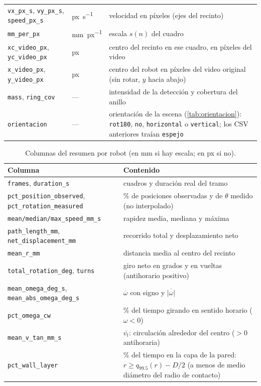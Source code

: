 \begin{table}[H]
\begin{tabular}{@{}p{3.9cm}lp{8.2cm}@{}}
    \texttt{vx\_px\_s}, \texttt{vy\_px\_s}, \texttt{speed\_px\_s} & \si{px\per\second} & velocidad en píxeles (ejes del recinto) \\
    \texttt{mm\_per\_px} & \si{\milli\metre\per px} & escala $s(n)$ del cuadro \\
    \texttt{xc\_video\_px}, \texttt{yc\_video\_px} & px & centro del recinto en ese cuadro, en píxeles del video \\
    \texttt{x\_video\_px}, \texttt{y\_video\_px} & px & centro del robot en píxeles del video original (sin rotar, $y$ hacia abajo) \\
    \texttt{mass}, \texttt{ring\_cov} & --- & intensidad de la detección y cobertura del anillo \\
    \texttt{orientacion} & --- & orientación de la escena (\cref{tab:orientacion}): \texttt{rot180}, \texttt{no}, \texttt{horizontal} o \texttt{vertical}; los CSV anteriores traían \texttt{espejo} \\
    \bottomrule
  \end{tabular}
\end{table}

\begin{table}[H]
  \centering
  \caption{Columnas del resumen por robot (en \si{\milli\metre} si hay escala; en px si no).}
  \label{tab:resumen}
  \small
  \begin{tabular}{@{}p{4.6cm}p{10.0cm}@{}}
    \toprule
    Columna & Contenido \\
    \midrule
    \texttt{frames}, \texttt{duration\_s} & cuadros y duración real del tramo \\
    \texttt{pct\_position\_observed}, \texttt{pct\_rotation\_measured} & \% de posiciones observadas y de $\theta$ medido (no interpolado) \\
    \texttt{mean/median/max\_speed\_mm\_s} & rapidez media, mediana y máxima \\
    \texttt{path\_length\_mm}, \texttt{net\_displacement\_mm} & recorrido total y desplazamiento neto \\
    \texttt{mean\_r\_mm} & distancia media al centro del recinto \\
    \texttt{total\_rotation\_deg}, \texttt{turns} & giro neto en grados y en vueltas (antihorario positivo) \\
    \texttt{mean\_omega\_deg\_s}, \texttt{mean\_abs\_omega\_deg\_s} & $\overline{\omega}$ con signo y $\overline{|\omega|}$ \\
    \texttt{pct\_omega\_cw} & \% del tiempo girando en sentido horario ($\omega<0$) \\
    \texttt{mean\_v\_tan\_mm\_s} & $\overline{v_t}$: circulación alrededor del centro ($>0$ antihoraria) \\
    \texttt{pct\_wall\_layer} & \% del tiempo en la capa de la pared: $r \geq q_{99.5}(r) - D/2$ (a menos de medio diámetro del radio de contacto) \\
    \bottomrule
  \end{tabular}
\end{table}

